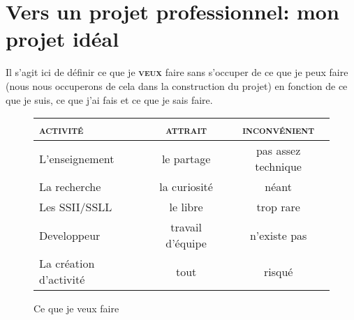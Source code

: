 \documentclass[a4paper,12pt, draft]{report}
\newcommand{\tabTitle}[1]{\hfill{} \textsc{#1} \hfill{} }
\begin{document}
\chapter[Mon projet idéal]{Vers un projet professionnel: mon projet idéal}
Il s'agit ici de définir ce que je \textsc{\textbf{veux}} faire sans s'occuper de ce que je peux faire (nous nous occuperons de cela dans la construction du projet) en fonction de ce que je suis, ce que j'ai fais et ce que je sais faire.


\begin{figure}[h]
\begin{center}
\begin{tabular}{|l|c|c|}
  \hline
  \tabTitle{activité} & \tabTitle{attrait} & \tabTitle{inconvénient}\\
  \hline
  \hline
  L'enseignement & le partage & pas assez technique\\
  \hline
  La recherche & la curiosité & néant \\
  \hline
  Les SSII\footnotemark{}/SSLL\footnotemark{} & le libre & trop rare\\
  \hline
  Developpeur & travail d'équipe & n'existe pas\footnotemark{}\\
  \hline
  La création d'activité & tout & risqué\\
  \hline
\end{tabular}
\end{center}
\caption{Ce que je veux faire}
\end{figure}

\end{document}
